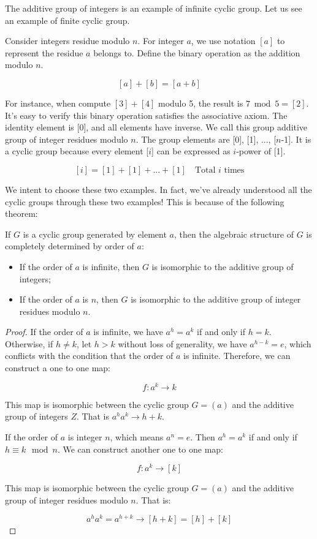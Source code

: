 \documentclass[b5paper]{article}
\begin{document}
The additive group of integers is an example of infinite cyclic group. Let us see an example of finite cyclic group.

\begin{example}
Consider integers residue modulo $n$. For integer $a$, we use notation $[a]$ to represent the residue $a$ belongs to. Define the binary operation as the addition modulo $n$.

\[
[a] + [b] = [a + b]
\]

For instance, when compute $[3] + [4]$ modulo 5, the result is $7 \bmod 5 = [2]$. It's easy to verify this binary operation satisfies the associative axiom. The identity element is [0], and all elements have inverse. We call this group additive group of integer residues modulo $n$. The group elements are [0], [1], ..., [$n$-1]. It is a cyclic group because every element [$i$] can be expressed as $i$-power of [1].

\[
[i] = [1] + [1] + ... + [1] \quad \text{Total $i$ times}
\]
\end{example}

We intent to choose these two examples. In fact, we've already understood all the cyclic groups through these two examples! This is because of the following theorem:

\begin{theorem}
If $G$ is a cyclic group generated by element $a$, then the algebraic structure of $G$ is completely determined by order of $a$:
\begin{itemize}
\item If the order of $a$ is infinite, then $G$ is isomorphic to the additive group of integers;
\item If the order of $a$ is $n$, then $G$ is isomorphic to the additive group of integer residues modulo $n$.
\end{itemize}
\end{theorem}

\begin{proof}
If the order of $a$ is infinite, we have $a^h = a^k$ if and only if $h = k$. Otherwise, if $h \neq k$, let $h > k$ without loss of generality, we have $a^{h - k} = e$, which conflicts with the condition that the order of $a$ is infinite. Therefore, we can construct a one to one map:

\[
f: a^k \to k
\]

This map is isomorphic between the cyclic group $G = (a)$ and the additive group of integers $Z$. That is $a^ha^k \to h + k$.

If the order of $a$ is integer $n$, which means $a^n = e$. Then $a^h = a^k$ if and only if $h \equiv k \mod n$. We can construct another one to one map:

\[
f: a^k \to [k]
\]

This map is isomorphic between the cyclic group $G = (a)$ and the additive group of integer residues modulo $n$. That is:

\[
a^ha^k = a^{h + k} \to [h + k] = [h] + [k]
\]
\end{proof}
\end{document}
